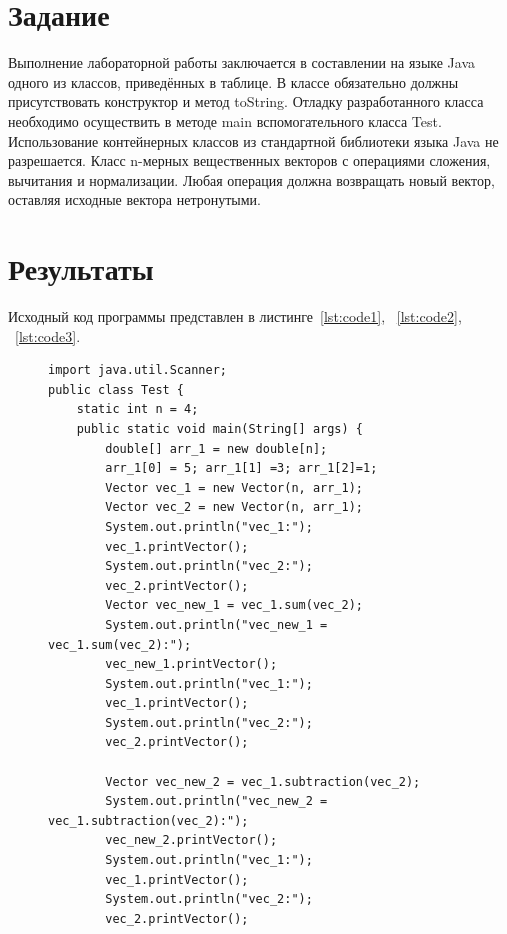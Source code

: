 \documentclass[a4paper, 14pt]{extarticle}
\begin{document}
\renewcommand{\ttdefault}{pcr}

\setlength{\tabcolsep}{3pt}
\newpage
\setcounter{page}{2}

\section{Задание}\label{Sect::task}
Выполнение лабораторной работы заключается в составлении на языке Java одного из
классов, приведённых в таблице. В классе обязательно должны присутствовать конструктор и метод toString.
Отладку разработанного класса необходимо осуществить в методе main
вспомогательного класса Test. Использование контейнерных классов из стандартной библиотеки языка Java не разрешается.
Класс n-мерных вещественных векторов с операциями сложения, вычитания и нормализации. Любая операция должна возвращать новый вектор, оставляя исходные вектора нетронутыми.

\section{Результаты}\label{Sect::res}

Исходный код программы представлен в листинге~\ref{lst:code1}, ~\ref{lst:code2}, ~\ref{lst:code3}.

\begin{figure}[!htb]
\begin{lstlisting}[language={},caption={класс Test},label={lst:code1}]
import java.util.Scanner;
public class Test {
    static int n = 4;
    public static void main(String[] args) {
        double[] arr_1 = new double[n];
        arr_1[0] = 5; arr_1[1] =3; arr_1[2]=1;
        Vector vec_1 = new Vector(n, arr_1);
        Vector vec_2 = new Vector(n, arr_1);
        System.out.println("vec_1:");
        vec_1.printVector();
        System.out.println("vec_2:");
        vec_2.printVector();
        Vector vec_new_1 = vec_1.sum(vec_2);
        System.out.println("vec_new_1 = vec_1.sum(vec_2):");
        vec_new_1.printVector();
        System.out.println("vec_1:");
        vec_1.printVector();
        System.out.println("vec_2:");
        vec_2.printVector();

        Vector vec_new_2 = vec_1.subtraction(vec_2);
        System.out.println("vec_new_2 = vec_1.subtraction(vec_2):");
        vec_new_2.printVector();
        System.out.println("vec_1:");
        vec_1.printVector();
        System.out.println("vec_2:");
        vec_2.printVector();
\end{lstlisting}
\end{figure}
\end{document}
